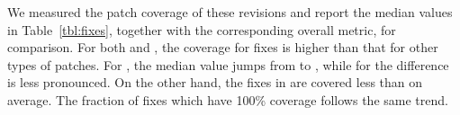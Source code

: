 
We measured the patch coverage of these revisions and report the
median values in Table~\ref{tbl:fixes}, together with the
corresponding overall metric, for comparison.  For both \memcached and
\redis, the coverage for fixes is higher than that for other types of patches. 
For \redis, the median value jumps from \memcachedPatchCovMedian to \memcachedFixLineCoverageMedian, while
for \memcached the difference is less pronounced.  On the other hand,
the fixes in \zeromq are covered less than on average.  The
fraction of fixes which have 100\% coverage follows the same trend.




